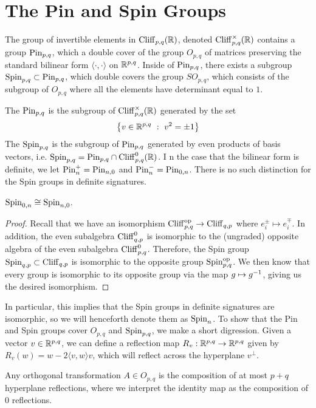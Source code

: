 %
\section{The Pin and Spin Groups}
%
The group of invertible elements in $\operatorname{Cliff}_{p,q}(\mathbb{R})$, denoted
$\operatorname{Cliff}_{p,q}^\times(\mathbb{R})$ contains a group $\mathrm{Pin}_{p,q}$, which a double
cover of the group $O_{p,q}$ of matrices preserving the standard bilinear
form $\langle \cdot,\cdot \rangle$ on $\mathbb{R}^{p,q}$. Inside of $\mathrm{Pin}_{p,q}$,
there exists a subgroup $\mathrm{Spin}_{p,q} \subset \mathrm{Pin}_{p,q}$, which double covers
the group $SO_{p,q}$, which consists of the subgroup of $O_{p,q}$ where
all the elements have determinant equal to $1$.
%
\begin{defn}
The  $\mathrm{Pin}_{p,q}$ is the subgroup of $\operatorname{Cliff}_{p,q}^\times(\mathbb{R})$
generated by the set
\[
\left\lbrace v \in \mathbb{R}^{p,q} ~:~ v^2 = \pm 1 \right\rbrace
\]
The  $\mathrm{Spin}_{p,q}$ is the subgroup of $\mathrm{Pin}_{p,q}$ generated by even
products of basis vectors, i.e. $\mathrm{Spin}_{p,q} = \mathrm{Pin}_{p,q} \cap \operatorname{Cliff}_{p,q}^0(\mathbb{R})$. I
n the case that the bilinear form is definite, we let $\mathrm{Pin}_n^+ = \mathrm{Pin}_{n,0}$
and $\mathrm{Pin}_n^- = \mathrm{Pin}_{0,n}$. There is no such distinction for the Spin groups
in definite signatures.
\end{defn}
%
\begin{thm}
$\mathrm{Spin}_{0,n} \cong \mathrm{Spin}_{n,0}$.
\end{thm}
%
\begin{proof}
Recall that we have an isomorphism $\operatorname{Cliff}_{p,q}^{\text{op}} \to \operatorname{Cliff}_{q,p}$
where $e_i^\pm \mapsto e_i^\mp$. In addition, the even subalgebra $\operatorname{Cliff}_{q,p}^0$
is isomorphic to the (ungraded) opposite algebra of the even subalgebra
$\operatorname{Cliff}_{p,q}^0$. Therefore, the Spin group $\mathrm{Spin}_{q,p} \subset \operatorname{Cliff}_{q,p}$
is isomorphic to the opposite group $\mathrm{Spin}_{p,q}^\text{op}$. We then know
that every group is isomorphic to its opposite group via the map $g \mapsto g^{-1}$,
giving us the desired isomorphism.
\end{proof}
%
In particular, this implies that the Spin groups in definite signatures are
isomorphic, so we will henceforth denote them as $\mathrm{Spin}_n$.
%
To show that the Pin and Spin groups cover $O_{p,q}$ and $\mathrm{Spin}_{p,q}$, we make
a short digression. Given a vector $v \in \mathbb{R}^{p,q}$, we can define a reflection
map $R_v : \mathbb{R}^{p,q} \to \mathbb{R}^{p,q}$ given by $R_v(w) = w - 2\langle v,w \rangle v$,
which will reflect across the hyperplane $v^\perp$.
%
\begin{thm}
Any orthogonal transformation $A \in O_{p,q}$ is the composition
of at most $p+q$ hyperplane reflections, where we interpret the identity map as the
composition of $0$ reflections.
\end{thm}

